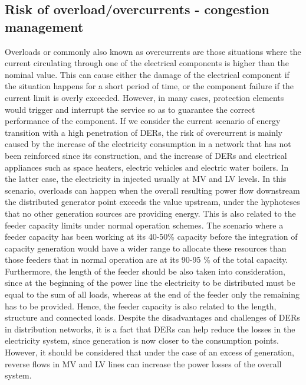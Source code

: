 \subsection{Risk of overload/overcurrents - congestion management}
Overloads or commonly also known as overcurrents are those situations where the current circulating through one of the electrical components is higher than the nominal value. This can cause either the damage of the electrical component if the situation happens for a short period of time, or the component failure if the current limit is overly exceeded. However, in many cases, protection elements would trigger and interrupt the service so as to guarantee the correct performance of the component. 
If we consider the current scenario of energy transition with a high penetration of DERs, the risk of overcurrent is mainly caused by the increase of the electricity consumption in a network that has not been reinforced since its construction, and the increase of DERs and electrical appliances such as space heaters, electric vehicles and electric water boilers. In the latter case, the electricity in injected usually at MV and LV levels. In this scenario, overloads can happen when the overall resulting power flow downstream the distributed generator point exceeds the value upstream, under the hyphoteses that no other generation sources are providing energy. This is also related to the feeder capacity limits under normal operation schemes. The scenario where a feeder capacity has been working at its 40-50\% capacity before the integration of capacity generation would have a wider range to allocate these resources than those feeders that in normal operation are at its 90-95 \% of the total capacity. Furthermore, the length of the feeder should be also taken into consideration, since at the beginning of the power line the electricity to be distributed must be equal to the sum of all loads, whereas at the end of the feeder only the remaining has to be provided. Hence, the feeder capacity is also related to the length, structure and connected loads. 
Despite the disadvantages and challenges of DERs in distribution networks, it is a fact that DERs can help reduce the losses in the electricity system, since generation is now closer to the consumption points. However, it should be considered that under the case of an excess of generation, reverse flows in MV and LV lines can increase the power losses of the overall system. 

